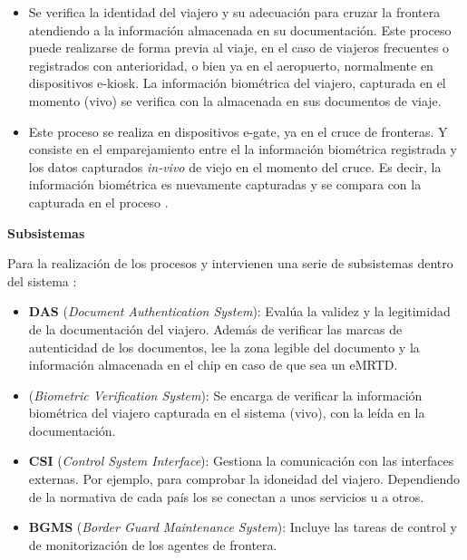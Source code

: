 \begin{itemize}
    \item 
    \textbf{}
    
    Se verifica la identidad del viajero y su adecuación para cruzar la frontera atendiendo a la información almacenada en su documentación. Este proceso puede realizarse de forma previa al viaje, en el caso de viajeros frecuentes o registrados con anterioridad, o bien ya en el aeropuerto, normalmente en dispositivos \gls{e-kiosk}. La información biométrica del viajero, capturada en el momento (\gls{vivo}) se verifica con la almacenada en sus documentos de viaje.
    
    \item 
    \textbf{}
    
    Este proceso se realiza en dispositivos \gls{e-gate}, ya en el cruce de fronteras.
    Y consiste en el emparejamiento entre el la información biométrica registrada y los datos capturados \textit{in-vivo} de viejo en el momento del cruce. Es decir, la información biométrica es nuevamente capturadas y se compara con la capturada en el proceso .
\end{itemize}

\medskip
\textbf{Subsistemas}

Para la realización de los procesos  y  intervienen una serie de subsistemas dentro del sistema :

\begin{itemize}
    \item 
    \textbf{DAS} (\textit{Document Authentication System}): Evalúa la validez y la legitimidad de la documentación del viajero. Además de verificar las marcas de autenticidad de los documentos, lee la zona legible del documento  y la información almacenada en el chip en caso de que sea un \gls{eMRTD}. 
    
    \item 
    \textbf{} (\textit{Biometric Verification System}): Se encarga de verificar la información biométrica del viajero capturada en el sistema (\gls{vivo}), con la leída en la documentación. 
    
    \item 
    \textbf{CSI} (\textit{Control System Interface}): Gestiona la comunicación con las interfaces externas. Por ejemplo, para comprobar la idoneidad del viajero. Dependiendo de la normativa de cada país los  se conectan a unos servicios u a otros. 
    
    \item
    \textbf{BGMS} (\textit{Border Guard Maintenance System}): Incluye las tareas de control y de monitorización de los agentes de frontera. 
\end{itemize}

